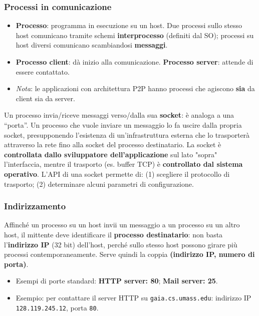 \documentclass[12pt, a4paper]{article}
\begin{document}
\subsubsection{Processi in comunicazione}

\begin{itemize}
    \item \textbf{Processo}: programma in esecuzione su un host. Due processi sullo stesso host comunicano tramite schemi \textbf{interprocesso} (definiti dal SO); processi su host diversi comunicano scambiandosi \textbf{messaggi}.
    \item \textbf{Processo client}: dà inizio alla comunicazione. \textbf{Processo server}: attende di essere contattato.
    \item \textit{Nota}: le applicazioni con architettura P2P hanno processi che agiscono \textbf{sia} da client sia da server.
\end{itemize}

\begin{tcolorbox}[colback=lightergray!10, colframe=tocsec, title=\textbf{Socket}]
Un processo invia/riceve messaggi verso/dalla sua \textbf{socket}: è analoga a una ``porta''. Un processo che vuole inviare un messaggio lo fa uscire dalla propria socket, presupponendo l'esistenza di un'infrastruttura esterna che lo trasporterà attraverso la rete fino alla socket del processo destinatario. La socket è \textbf{controllata dallo sviluppatore dell'applicazione} sul lato "sopra" l'interfaccia, mentre il trasporto (es. buffer TCP) è \textbf{controllato dal sistema operativo}. L'API di una socket permette di: (1) scegliere il protocollo di trasporto; (2) determinare alcuni parametri di configurazione.
\end{tcolorbox}

\subsubsection{Indirizzamento}

Affinché un processo su un host invii un messaggio a un processo su un altro host, il mittente deve identificare il \textbf{processo destinatario}: non basta l'\textbf{indirizzo IP} (32 bit) dell'host, perché sullo stesso host possono girare più processi contemporaneamente. Serve quindi la coppia \textbf{(indirizzo IP, numero di porta)}.

\begin{itemize}
    \item Esempi di porte standard: \textbf{HTTP server: 80}; \textbf{Mail server: 25}.
    \item Esempio: per contattare il server HTTP su \texttt{gaia.cs.umass.edu}: indirizzo IP \texttt{128.119.245.12}, porta \texttt{80}.
\end{itemize}
\end{document}
